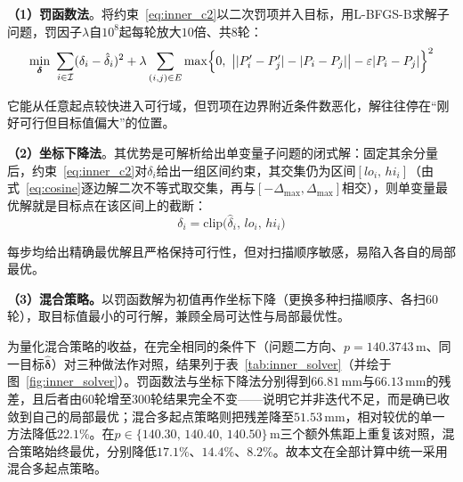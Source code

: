 \documentclass[withoutpreface]{cumcmthesis}
\begin{document}
\textbf{（1）罚函数法}\cite{yuan1997,nocedal2006}。将约束~\eqref{eq:inner_c2}以二次罚项并入目标，用L-BFGS-B求解子问题，罚因子$\lambda$自$10^{8}$起每轮放大$10$倍、共$8$轮：
\begin{equation}
\min_{\boldsymbol{\delta}}\ \sum_{i\in\mathcal{I}}(\delta_i-\hat{\delta}_i)^{2}
+\lambda\sum_{(i,j)\in E}\max\Bigl\{0,\ \bigl||P_i'-P_j'|-|P_i-P_j|\bigr|-\varepsilon|P_i-P_j|\Bigr\}^{2}
\end{equation}

它能从任意起点较快进入可行域，但罚项在边界附近条件数恶化，解往往停在``刚好可行但目标值偏大''的位置。

\textbf{（2）坐标下降法}\cite{nocedal2006}。其优势是可解析给出单变量子问题的闭式解：固定其余分量后，约束~\eqref{eq:inner_c2}对$\delta_i$给出一组区间约束，其交集仍为区间$[lo_i,\,hi_i]$（由式~\eqref{eq:cosine}逐边解二次不等式取交集，再与$[-\Delta_{\max},\Delta_{\max}]$相交），则单变量最优解就是目标点在该区间上的截断：
\begin{equation}\label{eq:clip}
\delta_i=\mathrm{clip}\bigl(\hat{\delta}_i,\,lo_i,\,hi_i\bigr)
\end{equation}

每步均给出精确最优解且严格保持可行性，但对扫描顺序敏感，易陷入各自的局部最优。

\textbf{（3）混合策略。}以罚函数解为初值再作坐标下降（更换多种扫描顺序、各扫$60$轮），取目标值最小的可行解，兼顾全局可达性与局部最优性。

为量化混合策略的收益，在完全相同的条件下（问题二方向、$p=140.3743\,\mathrm{m}$、同一目标$\hat{\boldsymbol{\delta}}$）对三种做法作对照，结果列于表~\ref{tab:inner_solver}（并绘于图~\ref{fig:inner_solver}）。罚函数法与坐标下降法分别得到$66.81\,\mathrm{mm}$与$66.13\,\mathrm{mm}$的残差，且后者由$60$轮增至$300$轮结果完全不变——说明它并非迭代不足，而是确已收敛到自己的局部最优；混合多起点策略则把残差降至$51.53\,\mathrm{mm}$，相对较优的单一方法降低$22.1\%$。在$p\in\{140.30,\,140.40,\,140.50\}\,\mathrm{m}$三个额外焦距上重复该对照，混合策略始终最优，分别降低$17.1\%$、$14.4\%$、$8.2\%$。故本文在全部计算中统一采用混合多起点策略。
\end{document}

